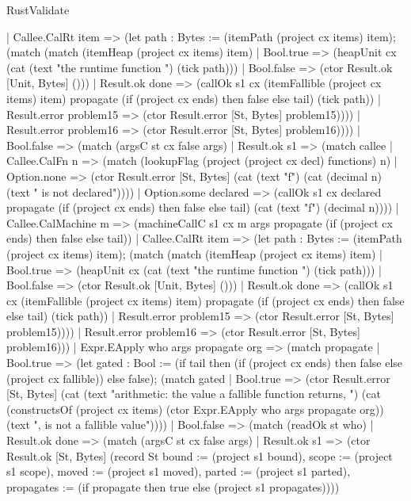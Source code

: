 \begin{lexlean}{RustValidate}
\begin{semanticmodule}
{            | Callee.CalRt item => (let path : Bytes := (itemPath (project cx items) item); (match (match (itemHeap (project cx items) item)
                | Bool.true => (heapUnit cx (cat (text "the runtime function ") (tick path)))
                | Bool.false => (ctor Result.ok [Unit, Bytes] ()))
              | Result.ok done => (callOk s1 cx (itemFallible (project cx items) item) propagate (if (project cx ends) then false else tail) (tick path))
              | Result.error problem15 => (ctor Result.error [St, Bytes] problem15))))
          | Result.error problem16 => (ctor Result.error [St, Bytes] problem16))))
      | Bool.false => (match (argsC st cx false args)
        | Result.ok s1 => (match callee
          | Callee.CalFn n => (match (lookupFlag (project (project cx decl) functions) n)
            | Option.none => (ctor Result.error [St, Bytes] (cat (text "f") (cat (decimal n) (text " is not declared"))))
            | Option.some declared => (callOk s1 cx declared propagate (if (project cx ends) then false else tail) (cat (text "f") (decimal n))))
          | Callee.CalMachine m => (machineCallC s1 cx m args propagate (if (project cx ends) then false else tail))
          | Callee.CalRt item => (let path : Bytes := (itemPath (project cx items) item); (match (match (itemHeap (project cx items) item)
              | Bool.true => (heapUnit cx (cat (text "the runtime function ") (tick path)))
              | Bool.false => (ctor Result.ok [Unit, Bytes] ()))
            | Result.ok done => (callOk s1 cx (itemFallible (project cx items) item) propagate (if (project cx ends) then false else tail) (tick path))
            | Result.error problem15 => (ctor Result.error [St, Bytes] problem15))))
        | Result.error problem16 => (ctor Result.error [St, Bytes] problem16)))
    | Expr.EApply who args propagate org => (match propagate
      | Bool.true => (let gated : Bool := (if tail then (if (project cx ends) then false else (project cx fallible)) else false); (match gated
        | Bool.true => (ctor Result.error [St, Bytes] (cat (text "arithmetic: the value a fallible function returns, ") (cat (constructsOf (project cx items) (ctor Expr.EApply who args propagate org)) (text ", is not a fallible value"))))
        | Bool.false => (match (readOk st who)
          | Result.ok done => (match (argsC st cx false args)
            | Result.ok s1 => (ctor Result.ok [St, Bytes] (record St {bound := (project s1 bound), scope := (project s1 scope), moved := (project s1 moved), parted := (project s1 parted), propagates := (if propagate then true else (project s1 propagates))}))
}
\end{semanticmodule}
\end{lexlean}
